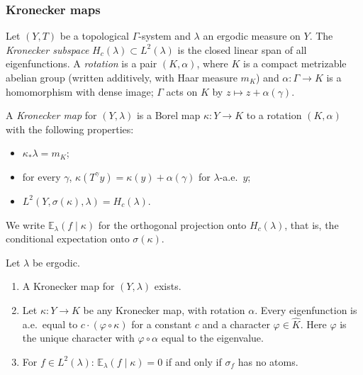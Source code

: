 \subsubsection*{Kronecker maps}
Let $(Y,T)$ be a topological $\Gamma$-system and $\lambda$ an ergodic measure on $Y$.
The \emph{Kronecker subspace} $H_c(\lambda)\subset L^2(\lambda)$ is the closed linear span of
all eigenfunctions.
A \emph{rotation} is a pair $(K,\alpha)$, where $K$ is a compact metrizable abelian group
(written additively, with Haar measure $m_K$) and $\alpha\colon\Gamma\to K$ is a homomorphism
with dense image; $\Gamma$ acts on $K$ by $z\mapsto z+\alpha(\gamma)$.

\begin{definition}\label{K:def:kron}
A \emph{Kronecker map} for $(Y,\lambda)$ is a Borel map $\kappa\colon Y\to K$ to a rotation
$(K,\alpha)$ with the following properties:
\begin{itemize}
\item $\kappa_*\lambda=m_K$;
\item for every $\gamma$, $\kappa(T^\gamma y)=\kappa(y)+\alpha(\gamma)$ for $\lambda$-a.e.\ $y$;
\item $L^2(Y,\sigma(\kappa),\lambda)=H_c(\lambda)$.
\end{itemize}
We write $\mathbb E_\lambda(f\mid\kappa)$ for the orthogonal projection onto $H_c(\lambda)$,
that is, the conditional expectation onto $\sigma(\kappa)$.
\end{definition}

\begin{lemma}\label{K:lem:kron}
Let $\lambda$ be ergodic.
\begin{enumerate}[label=(\alph*)]
\item\label{K:ka} A Kronecker map for $(Y,\lambda)$ exists.
\item\label{K:kb} Let $\kappa\colon Y\to K$ be any Kronecker map, with rotation $\alpha$. Every
eigenfunction is a.e.\ equal to $c\cdot(\varphi\circ\kappa)$ for a constant $c$ and a
character $\varphi\in\widehat K$. Here $\varphi$ is the unique character with
$\varphi\circ\alpha$ equal to the eigenvalue.
\item\label{K:kc} For $f\in L^2(\lambda)$: $\mathbb E_\lambda(f\mid\kappa)=0$ if and only if
$\sigma_f$ has no atoms.
\end{enumerate}
\end{lemma}

